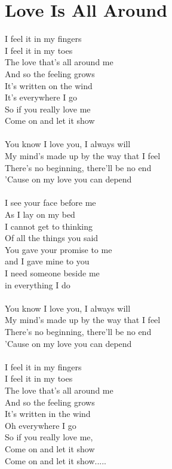 \section{Love Is All Around}
I feel it in my fingers\\
I feel it in my toes\\
The love that's all around me\\
And so the feeling grows\\
It's written on the wind\\
It's everywhere I go\\
So if you really love me\\
Come on and let it show\\
\\
You know I love you, I always will\\
My mind's made up by the way that I feel\\
There's no beginning, there'll be no end\\
'Cause on my love you can depend\\
\\
I see your face before me\\
As I lay on my bed\\
I cannot get to thinking\\
Of all the things you said\\
You gave your promise to me\\
and I gave mine to you\\
I need someone beside me\\
in everything I do\\
\\
You know I love you, I always will\\
My mind's made up by the way that I feel\\
There's no beginning, there'll be no end\\
'Cause on my love you can depend\\
\\
I feel it in my fingers\\
I feel it in my toes\\
The love that's all around me\\
And so the feeling grows\\
It's written in the wind\\
Oh everywhere I go\\
So if you really love me,\\
Come on and let it show\\
Come on and let it show.....\\
